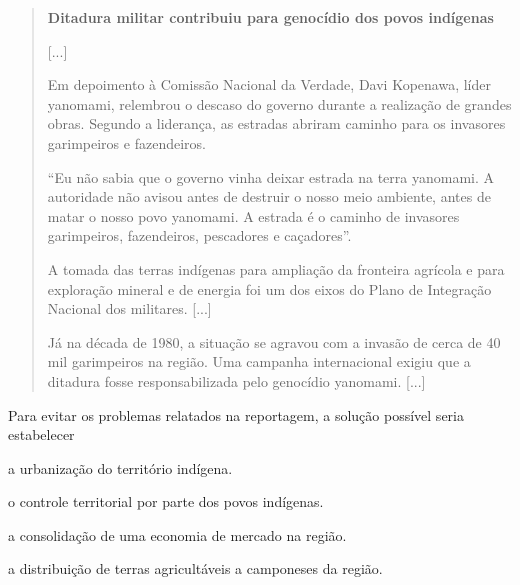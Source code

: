 \begin{quote}
\textbf{Ditadura militar contribuiu para genocídio dos povos indígenas}

{[}...{]}

Em depoimento à Comissão Nacional da Verdade, Davi Kopenawa, líder
yanomami, relembrou o descaso do governo durante a realização de grandes
obras. Segundo a liderança, as estradas abriram caminho para os
invasores garimpeiros e fazendeiros.

``Eu não sabia que o governo vinha deixar estrada na terra yanomami. A
autoridade não avisou antes de destruir o nosso meio ambiente, antes
de matar o nosso povo yanomami. A estrada é o caminho de invasores
garimpeiros, fazendeiros, pescadores e caçadores''.

A tomada das terras indígenas para ampliação da fronteira agrícola e
para exploração mineral e de energia foi um dos eixos do Plano de
Integração Nacional dos militares. {[}...{]}

Já na década de 1980, a situação se agravou com a invasão de cerca de
40 mil garimpeiros na região. Uma campanha internacional exigiu que a
ditadura fosse responsabilizada pelo genocídio yanomami. {[}...{]}

\end{quote}

Para evitar os problemas relatados na reportagem, a solução possível
seria estabelecer

\begin{escolha}
\item  a urbanização do território indígena.

\item  o controle territorial por parte dos povos indígenas.

\item  a consolidação de uma economia de mercado na região.

\item  a distribuição de terras agricultáveis a camponeses da região.
\end{escolha}

